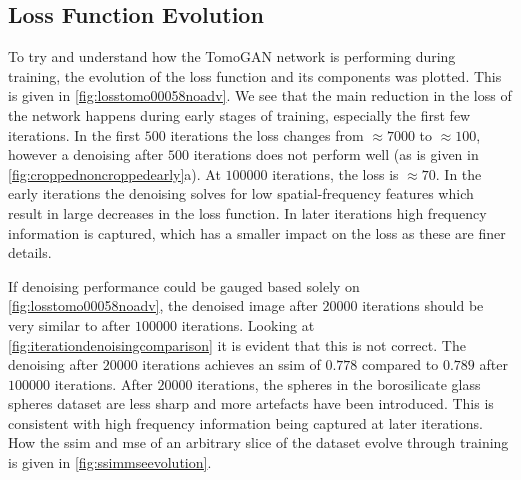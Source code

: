 \subsection{Loss Function Evolution}
To try and understand how the TomoGAN network is performing during training, the evolution of the loss function and its components was plotted. This is given in \cref{fig:losstomo00058noadv}. We see that the main reduction in the loss of the network happens during early stages of training, especially the first few iterations. In the first $500$ iterations the loss changes from $\approx 7000$ to $\approx 100$, however a denoising after $500$ iterations does not perform well (as is given in \cref{fig:croppednoncroppedearly}a). At $100000$ iterations, the loss is $\approx 70$. In the early iterations the denoising solves for low spatial-frequency features which result in large decreases in the loss function. In later iterations high frequency information is captured, which has a smaller impact on the loss as these are finer details. 

If denoising performance could be gauged based solely on \cref{fig:losstomo00058noadv}, the denoised image after $20000$ iterations should be very similar to after $100000$ iterations. Looking at \cref{fig:iterationdenoisingcomparison} it is evident that this is not correct. The denoising after $20000$ iterations achieves an \gls{ssim} of $0.778$ compared to $0.789$ after $100000$ iterations. After $20000$ iterations, the spheres in the borosilicate glass spheres dataset are less sharp and more artefacts have been introduced. This is consistent with high frequency information being captured at later iterations. How the \gls{ssim} and \gls{mse} of an arbitrary slice of the dataset evolve through training is given in \cref{fig:ssimmseevolution}. 

